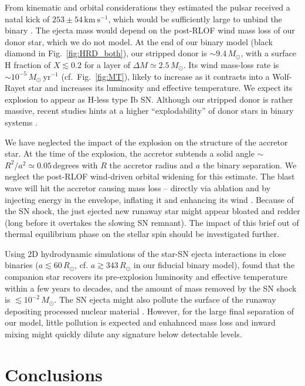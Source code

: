 \documentclass[twocolumn,twocolappendix,trackchanges]{aastex63}
\newcommand{\kms}{{\mathrm{km\ s^{-1}}}}
\DeclareRobustCommand{\Figref}[1]{Fig.~\ref{#1}}
\begin{document}
From kinematic and orbital considerations they estimated the pulsar
received a natal kick of
$253\pm54\,\kms$, which would be sufficiently large to unbind the binary \citep{kalogera:96, tauris:15}.  The ejecta mass would depend on the post-RLOF wind mass loss of our donor star, which we do not model.  At the end of our binary model (black diamond in \Figref{fig:HRD_both}), our stripped donor is
$\sim$$9.4\,M_\odot$, with a surface H fraction of $X\lesssim0.2$ for
a layer of $\Delta M \simeq 2.5\,M_\odot$.  Its wind mass-loss rate is
$\sim10^{-5}\,M_\odot \ \mathrm{yr^{-1}}$ (cf.~\Figref{fig:MT}),
likely to increase as it contracts into a Wolf-Rayet star and
increases its luminosity and effective temperature. We expect its
explosion to appear as H-less type Ib SN. Although our stripped donor
is rather massive, recent studies hints at a higher ``explodability''
of donor stars in binary systems \citep[e.g.,][]{schneider:21,
  laplace:21, vartanyan:21}.

We have neglected the impact of the explosion on the structure of the
accretor star. At the time of the explosion, the accretor subtends a
solid angle $\sim$$R^2/a^2\simeq
0.05$\,degrees with $R$ the accretor radius and
$a$ the binary separation. We neglect the post-RLOF wind-driven orbital widening for this estimate.  The blast wave will hit the accretor causing mass loss -- directly via ablation and by injecting energy in the envelope, inflating it and enhancing its wind \citep{wheeler:75, tauris:98, podsiadlowski:03, hirai:18}.  Because of the SN shock, the just ejected new runaway star might appear bloated and redder (long before it overtakes the slowing SN remnant). The impact of this brief out of thermal equilibrium phase on the stellar spin should be investigated further.

Using 2D hydrodynamic simulations of the star-SN ejecta interactions in close binaries ($a\lesssim
60\,R_\odot$, cf. $a\gtrsim
343\,R_\odot$ in our fiducial binary model), \cite{hirai:18} found that the companion star recovers its pre-explosion luminosity and effective temperature within a few years to decades, and the amount of mass removed by the SN shock is
$\lesssim10^{-2}\,M_\odot$.  The SN ejecta might also pollute the surface of the runaway depositing processed nuclear material \citep[e.g.,][]{przybilla:08, suda:21}. However, for the large final separation of our model, little pollution is expected and enhahnced mass loss and inward mixing might quickly dilute any signature below detectable levels.


\section{Conclusions}
\label{sec:conclusions}
\end{document}
